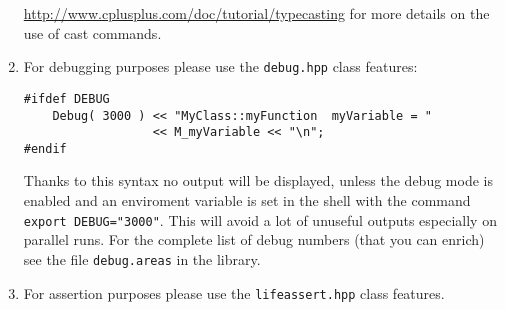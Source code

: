 \documentclass[a4paper]{article}
\begin{document}
\begin{enumerate}
  \url{http://www.cplusplus.com/doc/tutorial/typecasting} for more details on the use of cast commands.
  \item For debugging purposes please use the \texttt{debug.hpp} class features:
\begin{lstlisting}
#ifdef DEBUG
    Debug( 3000 ) << "MyClass::myFunction  myVariable = "
                  << M_myVariable << "\n";
#endif
\end{lstlisting}
  Thanks to this syntax no output will be displayed, unless the debug mode is enabled and an enviroment variable is set in the shell with the command \texttt{export DEBUG="3000"}. This will avoid a lot of unuseful outputs especially on parallel runs. For the complete list of debug numbers (that you can enrich) see the file \texttt{debug.areas} in the library.
  \item For assertion purposes please use the \texttt{lifeassert.hpp} class features.
\end{enumerate}
\end{document}
